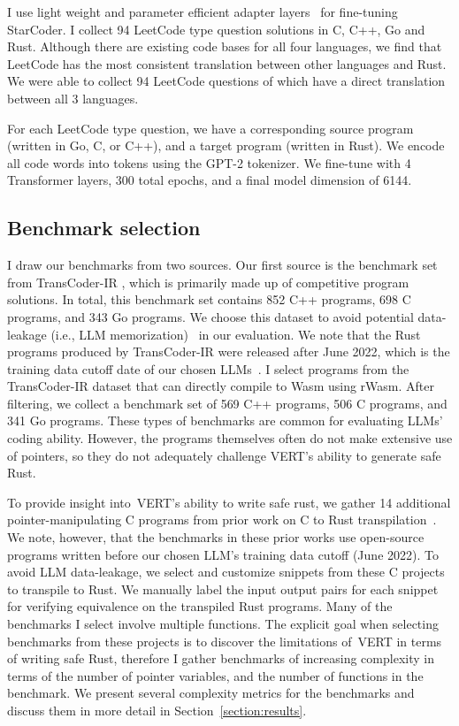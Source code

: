 \documentclass[12pt,openany,oneside,table]{cmuthesis}
\begin{document}
I use light weight and parameter efficient adapter layers~\cite{hu2023llm, yang2024large, peft} for fine-tuning StarCoder. 
I collect 94 LeetCode type question solutions in C, C++, Go and Rust. Although there are existing code bases for all four languages, we find that LeetCode has the most consistent translation between other languages and Rust. We were able to collect 94 LeetCode questions of which have a direct translation between all 3 languages.

For each LeetCode type question, we have a corresponding source program (written in Go, C, or C++), and a target program (written in Rust). We encode all code words into tokens using the GPT-2 tokenizer. We fine-tune with 4 Transformer layers, 300 total epochs, and a final model dimension of 6144.

\subsection{Benchmark selection}
I draw our benchmarks from two sources. Our first source is the benchmark set from TransCoder-IR \cite{szafraniec2022code}, which is primarily made up of competitive program solutions. In total, this benchmark set contains 852 C++ programs, 698 C programs, and 343 Go programs. We choose this dataset to avoid potential data-leakage (i.e., LLM memorization)~\cite{biderman2024emergent} in our evaluation. We note that the Rust programs produced by TransCoder-IR were released after June 2022, which is the training data cutoff date of our chosen LLMs~\cite{li2023starcoder, claude, codellama}. 
I select programs from the TransCoder-IR dataset that can directly compile to Wasm using rWasm. After filtering, we collect a benchmark set of 569 C++ programs, 506 C programs, and 341 Go programs. 
These types of benchmarks are common for evaluating LLMs' coding ability. However, the programs themselves often do not make extensive use of pointers, so they do not adequately challenge VERT{}'s ability to generate safe Rust. 


To provide insight into~VERT{}'s ability to write safe rust, we gather 14 additional pointer-manipulating C programs from prior work on C to Rust transpilation~\cite{C2Rust, zhang2023ownership, emre2021translating}. We note, however, that the benchmarks in these prior works use open-source programs written before our chosen LLM's training data cutoff (June 2022). To avoid LLM data-leakage, we select and customize snippets from these C projects to transpile to Rust. We manually label the input output pairs for each snippet for verifying equivalence on the transpiled Rust programs. Many of the benchmarks I select involve multiple functions. The explicit goal when selecting benchmarks from these projects is to discover the limitations of~VERT{} in terms of writing safe Rust, therefore I gather benchmarks of increasing complexity in terms of the number of pointer variables, and the number of functions in the benchmark. We present several complexity metrics for the benchmarks and discuss them in more detail in Section~\ref{section:results}. 
\end{document}
